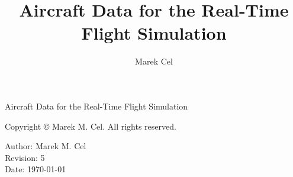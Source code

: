 \documentclass[12pt,a4paper]{report}
\title{Aircraft Data for the Real-Time Flight Simulation}
\author{Marek Cel}
\date{}
\begin{document}
  
  \begin{titlepage}
    \centering
    {\huge Aircraft Data for the Real-Time Flight Simulation\par}
  \end{titlepage}
  

  \noindent Copyright \copyright{} \the\year{} Marek M. Cel. All rights reserved.

  \noindent Author: Marek M. Cel \\
  Revision: 5 \\
  Date: \today

  
  
  {
    \clearpage
    \setlength{\parskip}{0em}
    \tableofcontents
  }

  
  
  
  
  \clearpage
   
  
  
\end{document}

